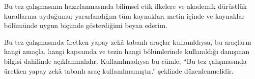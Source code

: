 Bu tez çalışmasının hazırlanmasında bilimsel etik
ilkelere ve akademik dürüstlük kurallarına uyduğumu; yararlandığım
tüm kaynakları metin içinde ve kaynaklar bölümünde uygun
biçimde gösterdiğimi beyan ederim.

Bu tez çalışmasında üretken yapay zek\^a tabanlı araçlar
kullanıldıysa, bu araçların hangi amaçla, hangi kapsamda ve
tezin hangi bölümlerinde kullanıldığı danışman bilgisi
dahilinde açıklanmalıdır. Kullanılmadıysa bu cümle,
``Bu tez çalışmasında üretken yapay zek\^a tabanlı araç
kullanılmamıştır.'' şeklinde düzenlenmelidir.
